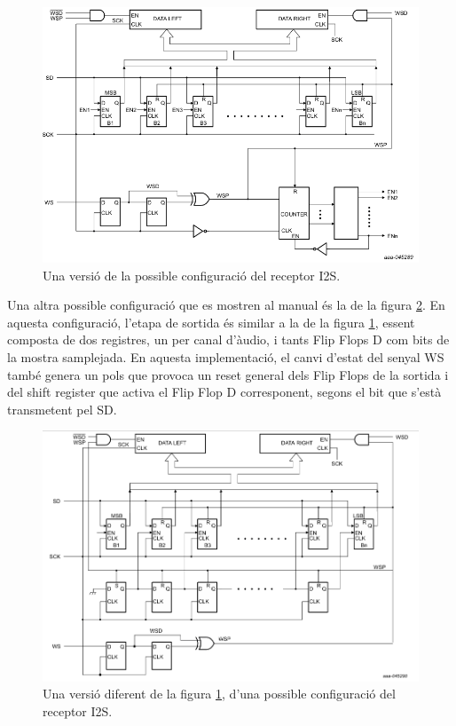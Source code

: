  \begin{figure}[H]
     \centering
     \includegraphics[width=0.6\linewidth]{Images/i2s_receiver_1.png}
     \caption{Una versió de la possible configuració del receptor I2S.\cite{I2S_manual}}
     \label{receptor_i2s1_fig}
 \end{figure}

 \par Una altra possible configuració que es mostren al manual \cite{I2S_manual} és la de la figura \ref{receptor_i2s2_fig}. En aquesta configuració, l'etapa de sortida és similar a la de la figura \ref{receptor_i2s1_fig}, essent composta de dos registres, un per canal d'àudio, i tants Flip Flops D com bits de la mostra samplejada. En aquesta implementació, el canvi d'estat del senyal WS també genera un pols que provoca un reset general dels Flip Flops de la sortida i del shift register que activa el Flip Flop D corresponent, segons el bit que s'està transmetent pel SD.
 \begin{figure}[H]
     \centering
     \includegraphics[width=0.6\linewidth]{Images/i2s_receiver_2.png}
     \caption{Una versió diferent de la figura \ref{receptor_i2s1_fig}, d'una possible configuració del receptor I2S. \cite{I2S_manual}}
     \label{receptor_i2s2_fig}
 \end{figure}

